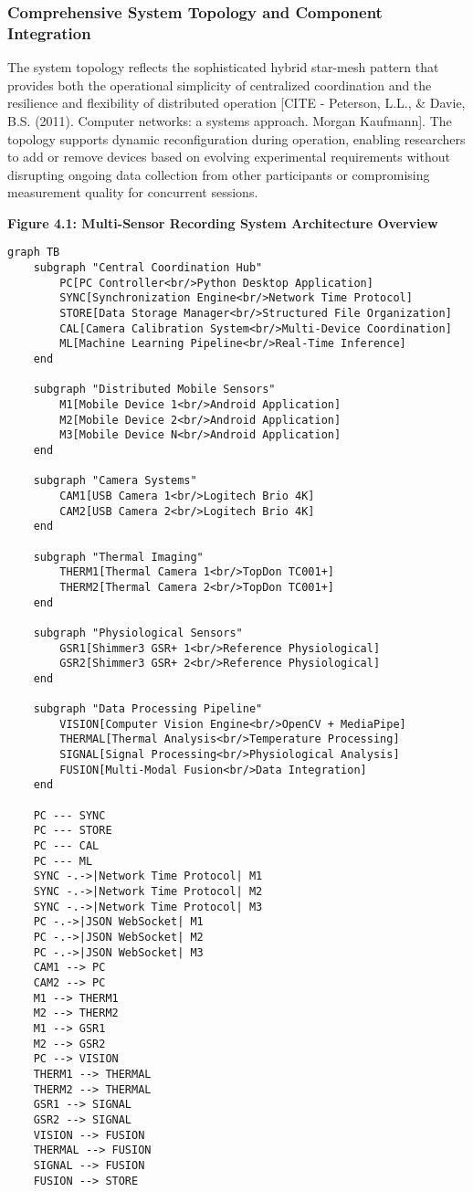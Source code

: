 \documentclass[12pt,a4paper]{report}
\begin{document}
\subsubsection{Comprehensive System Topology and Component Integration}

The system topology reflects the sophisticated hybrid star-mesh pattern that provides both the operational simplicity of
centralized coordination and the resilience and flexibility of distributed
operation [CITE - Peterson, L.L., \& Davie, B.S. (2011). Computer networks: a systems approach. Morgan Kaufmann]. The
topology supports dynamic reconfiguration during operation, enabling researchers to add or remove devices based on
evolving experimental requirements without disrupting ongoing data collection from other participants or compromising
measurement quality for concurrent sessions.

\textbf{Figure 4.1: Multi-Sensor Recording System Architecture Overview}

\begin{verbatim}
graph TB
    subgraph "Central Coordination Hub"
        PC[PC Controller<br/>Python Desktop Application]
        SYNC[Synchronization Engine<br/>Network Time Protocol]
        STORE[Data Storage Manager<br/>Structured File Organization]
        CAL[Camera Calibration System<br/>Multi-Device Coordination]
        ML[Machine Learning Pipeline<br/>Real-Time Inference]
    end

    subgraph "Distributed Mobile Sensors"
        M1[Mobile Device 1<br/>Android Application]
        M2[Mobile Device 2<br/>Android Application]
        M3[Mobile Device N<br/>Android Application]
    end

    subgraph "Camera Systems"
        CAM1[USB Camera 1<br/>Logitech Brio 4K]
        CAM2[USB Camera 2<br/>Logitech Brio 4K]
    end

    subgraph "Thermal Imaging"
        THERM1[Thermal Camera 1<br/>TopDon TC001+]
        THERM2[Thermal Camera 2<br/>TopDon TC001+]
    end

    subgraph "Physiological Sensors"
        GSR1[Shimmer3 GSR+ 1<br/>Reference Physiological]
        GSR2[Shimmer3 GSR+ 2<br/>Reference Physiological]
    end

    subgraph "Data Processing Pipeline"
        VISION[Computer Vision Engine<br/>OpenCV + MediaPipe]
        THERMAL[Thermal Analysis<br/>Temperature Processing]
        SIGNAL[Signal Processing<br/>Physiological Analysis]
        FUSION[Multi-Modal Fusion<br/>Data Integration]
    end

    PC --- SYNC
    PC --- STORE
    PC --- CAL
    PC --- ML
    SYNC -.->|Network Time Protocol| M1
    SYNC -.->|Network Time Protocol| M2
    SYNC -.->|Network Time Protocol| M3
    PC -.->|JSON WebSocket| M1
    PC -.->|JSON WebSocket| M2
    PC -.->|JSON WebSocket| M3
    CAM1 --> PC
    CAM2 --> PC
    M1 --> THERM1
    M2 --> THERM2
    M1 --> GSR1
    M2 --> GSR2
    PC --> VISION
    THERM1 --> THERMAL
    THERM2 --> THERMAL
    GSR1 --> SIGNAL
    GSR2 --> SIGNAL
    VISION --> FUSION
    THERMAL --> FUSION
    SIGNAL --> FUSION
    FUSION --> STORE
\end{verbatim}
\end{document}
